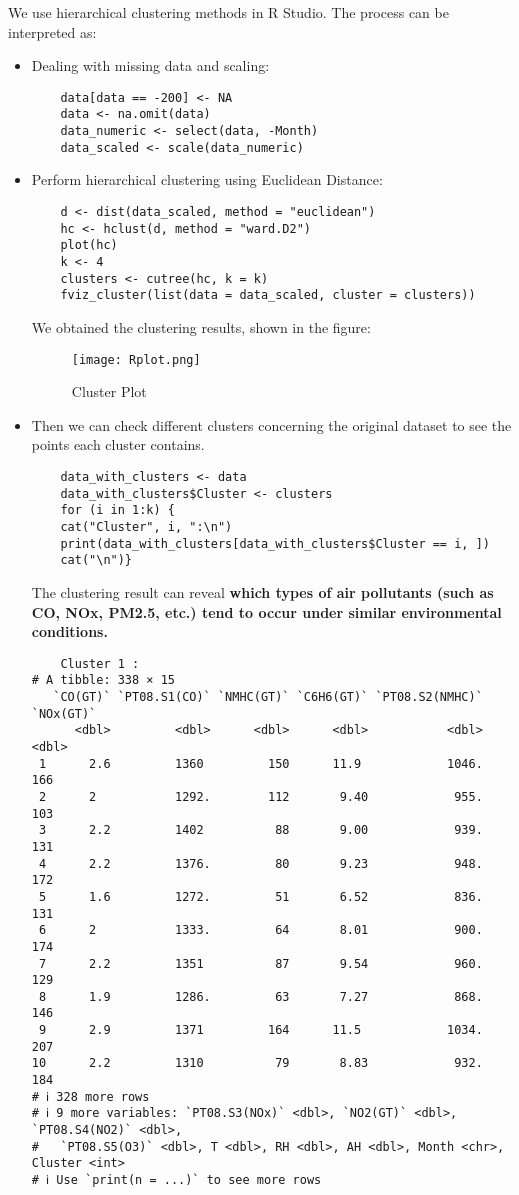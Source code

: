 \documentclass{article}
\begin{document}
We use hierarchical clustering methods in R Studio. The process can be interpreted as:
\begin{itemize}
    \item Dealing with missing data and scaling:
    \begin{verbatim}
    data[data == -200] <- NA
    data <- na.omit(data)
    data_numeric <- select(data, -Month)
    data_scaled <- scale(data_numeric)
    \end{verbatim}
    \item Perform hierarchical clustering using Euclidean Distance:
    \begin{verbatim}
    d <- dist(data_scaled, method = "euclidean")
    hc <- hclust(d, method = "ward.D2")
    plot(hc)
    k <- 4 
    clusters <- cutree(hc, k = k)
    fviz_cluster(list(data = data_scaled, cluster = clusters))
    \end{verbatim}
We obtained the clustering results, shown in the figure:
    \begin{figure}[H]
    \centering
    \texttt{[image: Rplot.png]}
    \label{fig:unique_label_1}
    \caption{Cluster Plot}
    \end{figure}
\item Then we can check different clusters concerning the original dataset to see the points each cluster contains.
\begin{verbatim}
    data_with_clusters <- data
    data_with_clusters$Cluster <- clusters
    for (i in 1:k) {
    cat("Cluster", i, ":\n")
    print(data_with_clusters[data_with_clusters$Cluster == i, ])
    cat("\n")}
\end{verbatim}
 The clustering result can reveal \textbf{which types of air pollutants (such as CO, NOx, PM2.5, etc.) tend to occur under similar environmental conditions.}

\begin{verbatim}
    Cluster 1 :
# A tibble: 338 × 15
   `CO(GT)` `PT08.S1(CO)` `NMHC(GT)` `C6H6(GT)` `PT08.S2(NMHC)` `NOx(GT)`
      <dbl>         <dbl>      <dbl>      <dbl>           <dbl>     <dbl>
 1      2.6         1360         150      11.9            1046.       166
 2      2           1292.        112       9.40            955.       103
 3      2.2         1402          88       9.00            939.       131
 4      2.2         1376.         80       9.23            948.       172
 5      1.6         1272.         51       6.52            836.       131
 6      2           1333.         64       8.01            900.       174
 7      2.2         1351          87       9.54            960.       129
 8      1.9         1286.         63       7.27            868.       146
 9      2.9         1371         164      11.5            1034.       207
10      2.2         1310          79       8.83            932.       184
# ℹ 328 more rows
# ℹ 9 more variables: `PT08.S3(NOx)` <dbl>, `NO2(GT)` <dbl>, `PT08.S4(NO2)` <dbl>,
#   `PT08.S5(O3)` <dbl>, T <dbl>, RH <dbl>, AH <dbl>, Month <chr>, Cluster <int>
# ℹ Use `print(n = ...)` to see more rows


\end{verbatim}
\end{itemize}
\end{document}
